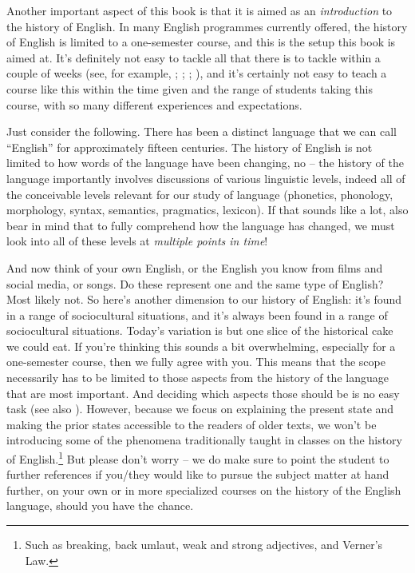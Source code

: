 \noindent Another important aspect of this book is that it is aimed as an \emph{introduction} to the history of English. In many English programmes currently offered, the history of English is limited to a one-semester course, and this is the setup this book is aimed at. It's definitely not easy to tackle all that there is to tackle within a couple of weeks (see, for example, \citealp[4]{HayesBurkette2017intro}; \citealp[60]{Giancarlo2017}; \citealp[195]{Hayes2017}; \citealp[107]{Hayes2017b}), and it's certainly not easy to teach a course like this within the time given and the range of students taking this course, with so many different experiences and expectations.

Just consider the following. There has been a distinct language that we can call ``English'' for approximately fifteen centuries. The history of English is not limited to how words of the language have been changing, no -- the history of the language importantly involves discussions of various linguistic levels, indeed all of the conceivable levels relevant for our study of language (phonetics, phonology, morphology, syntax, semantics, pragmatics, lexicon). If that sounds like a lot, also bear in mind that to fully comprehend how the language has changed, we must look into all of these levels at \emph{multiple points in time}!

And now think of your own English, or the English you know from films and social media, or songs. Do these represent one and the same type of English? Most likely not. So here's another dimension to our history of English: it's found in a range of sociocultural situations, and it's always been found in a range of sociocultural situations. Today's variation is but one slice of the historical cake we could eat. If you're thinking this sounds a bit overwhelming, especially for a one-semester course, then we fully agree with you. This means that the scope necessarily has to be limited to those aspects from the history of the language that are most important. And deciding which aspects those should be is no easy task (see also \citealp[47]{Buck2003}). However, because we focus on explaining the present state and making the prior states accessible to the readers of older texts, we won't be introducing some of the phenomena traditionally taught in classes on the history of English.\footnote{Such as breaking, back umlaut, weak and strong adjectives, and Verner's Law.} But please don't worry -- we do make sure to point the student to further references if you/they would like to pursue the subject matter at hand further, on your own or in more specialized courses on the history of the English language, should you have the chance.


